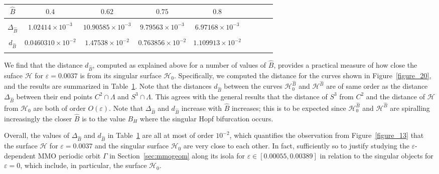 \documentclass{ws-ijbc}
\begin{document}
\begin{table}[t!]
        {\begin{tabular}{c  c  c  c  c  c  c  c  c} \\[-2pt]
            \toprule
            $\widehat{B}$ & $0.4$ & $0.62$ & $0.75$ & $0.8$  \\[6pt]
            \hline\\[-6pt]
            $\Delta_{\widehat{B}}$ & $1.02414 \times 10^{-3}$ & $10.90585 \times 10^{-3}$ & $9.79563 \times 10^{-3}$ & $6.97168 \times 10^{-3}$ \\[6pt]
            \hline\\[-6pt]
            $d_{\widehat{B}}$ & $0.0460310 \times 10^{-2}$ & $1.47538 \times 10^{-2}$ & $0.763856 \times 10^{-2}$ & $1.109913 \times 10^{-2}$ \\[1pt]
            \botrule
        \end{tabular}}
\label{table:dist}
\end{table}

We find that the distance $d_{\widehat{B}}$, computed as explained above for a number of values of $\widehat{B}$, provides a practical measure of how close the suface $\mathscr{H}$ for $\varepsilon = 0.0037$ is from its singular surface $\mathscr{H}_0$. Specifically, we computed the distance for the curves shown in Figure~\ref{figure_20}, and the results are summarized in Table~\ref{table:dist}. Note that the distances $d_{\widehat{B}}$ between the curves $\mathscr{H}_0^{\widehat{B}}$ and $\mathscr{H}^{\widehat{B}}$ are of same order as the distance  $\Delta_{\widehat{B}}$ between their end points $C^2 \cap \Lambda$ and $S^3 \cap \Lambda$. This agrees with the general results \cite{Fenichel} that the distance of $S^3$ from $C^2$ and the distance of $\mathscr{H}$ from $\mathscr{H}_0$ are both of order $O(\varepsilon)$. Note that $\Delta_{\widehat{B}}$ and $d_{\widehat{B}}$ increase with $\widehat{B}$ increases; this is to be expected since $\mathscr{H}_0^{\widehat{B}}$ and $\mathscr{H}^{\widehat{B}}$ are spiralling increasingly the closer $\widehat{B}$ is to the value $B_H$ where the singular Hopf bifurcation occurs.  

Overall, the values of $\Delta_{\widehat{B}}$ and $d_{\widehat{B}}$ in Table~\ref{table:dist} are all at most of order $10^{-2}$, which quantifies the observation from Figure~\ref{figure_13} that the surface $\mathscr{H}$ for $\varepsilon = 0.0037$ and the singular surface $\mathscr{H}_0$ are very close to each other. In fact, sufficiently so to justify studying the $\varepsilon$-dependent MMO periodic orbit $\Gamma$ in Section~\ref{sec:mmogeom} along its isola for $\varepsilon \in [0.00055, 0.00389]$ in relation to the singular objects for $\varepsilon = 0$, which include, in particular, the surface $\mathscr{H}_0$.
\end{document}
